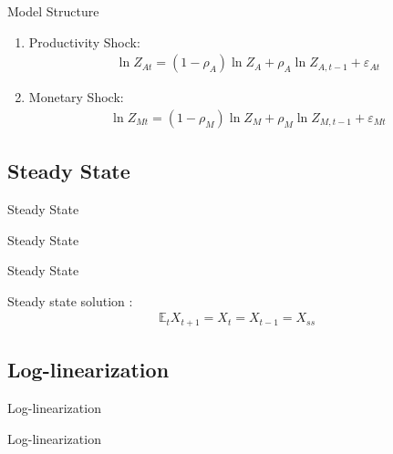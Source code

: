 \documentclass[../quali_slides.tex]{subfiles}
\begin{document}
\begin{frame}[allowframebreaks]{Model Structure}
{\begin{enumerate}
	\item Productivity Shock:
	\begin{align}
		\ln{Z_{At}} = (1-\rho_A)\ln{Z_A} + \rho_A\ln{Z_{A,t-1}} + \varepsilon_{At}
	\end{align}
	
	\item Monetary Shock:
	\begin{align}
		\ln{Z_{Mt}} = (1-\rho_M)\ln{Z_{M}} + \rho_M\ln{Z_{M,t-1}} + \varepsilon_{Mt}
	\end{align}
	
\end{enumerate}		
		
	} %
	
\end{frame}


\subsection{Steady State}

\begin{frame}{Steady State}
	
	\centering \huge Steady State
	
\end{frame}


\begin{frame}{Steady State}
	
	Steady state solution \cite[p.41]{costa_junior_understanding_2016}:
	\begin{align}
		\mathbb{E}_t X_{t+1} = X_t = X_{t-1} = X_{ss}
	\end{align}
		
\end{frame}


\subsection{Log-linearization}

\begin{frame}{Log-linearization}
	
	\centering \huge Log-linearization
		
\end{frame}
\end{document}
